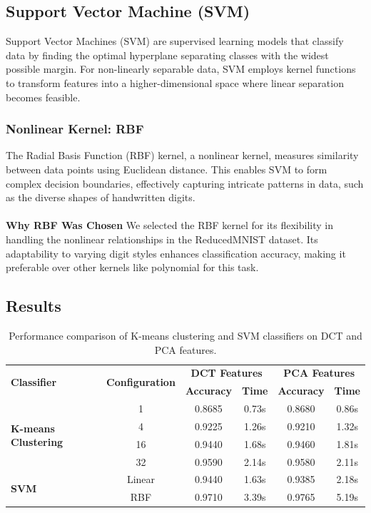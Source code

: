 \documentclass[12pt]{article}
\begin{document}
\subsection{Support Vector Machine (SVM)}

Support Vector Machines (SVM) are supervised learning models that classify data by finding the optimal hyperplane separating classes with the widest possible margin. For non-linearly separable data, SVM employs kernel functions to transform features into a higher-dimensional space where linear separation becomes feasible.

\subsubsection{Nonlinear Kernel: RBF}  
The Radial Basis Function (RBF) kernel, a nonlinear kernel, measures similarity between data points using Euclidean distance. This enables SVM to form complex decision boundaries, effectively capturing intricate patterns in data, such as the diverse shapes of handwritten digits.\\ \\
\textbf{Why RBF Was Chosen}  
We selected the RBF kernel for its flexibility in handling the nonlinear relationships in the ReducedMNIST dataset. Its adaptability to varying digit styles enhances classification accuracy, making it preferable over other kernels like polynomial for this task.\\

\subsection{Results}
\begin{table}[h]
    \centering
    \caption{Performance comparison of K-means clustering and SVM classifiers on DCT and PCA features.}
    \label{tab:classifier_performance}
    \begin{tabular}{|l|c|c|c|c|c|}
        \hline
        \multirow{2}{*}{\textbf{Classifier}} & \multirow{2}{*}{\textbf{Configuration}} & \multicolumn{2}{c|}{\textbf{DCT Features}} & \multicolumn{2}{c|}{\textbf{PCA Features}} \\
        \cline{3-6}
        & & \textbf{Accuracy} & \textbf{Time} & \textbf{Accuracy} & \textbf{Time} \\
        \hline
        \multirow{4}{*}{\textbf{K-means Clustering}} 
        & 1 & 0.8685 & 0.73s & 0.8680 & 0.86s \\
        & 4 & 0.9225 & 1.26s & 0.9210 & 1.32s \\
        & 16 & 0.9440 & 1.68s & 0.9460 & 1.81s \\
        & 32 & 0.9590 & 2.14s & 0.9580 & 2.11s \\
        \hline
        \multirow{2}{*}{\textbf{SVM}} 
        & Linear & 0.9440 & 1.63s & 0.9385 & 2.18s \\
        & RBF & 0.9710 & 3.39s & 0.9765 & 5.19s \\
        \hline
    \end{tabular}
\end{table}
\newpage
\end{document}
